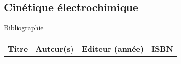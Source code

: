 \begin{headerBlock}
\chapter{Cinétique électrochimique}
\label{LC_CinetiqueElectrochimique}
 \end{headerBlock}



\begin{reportBlock}{Bibliographie}

\begin{center}
\begin{tabularx}{\textwidth}{| X | X | c | c |}\hline
Titre & Auteur(s) & Editeur (année) & ISBN \\ \hline
 &  &  &  \\ 
 \hline
\end{tabularx}
\end{center}

\end{reportBlock}

